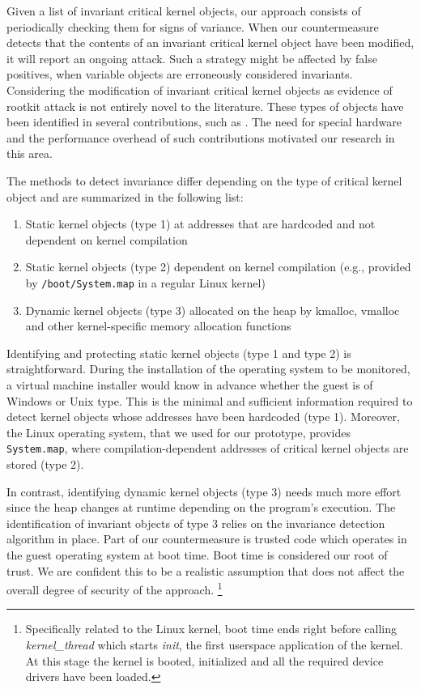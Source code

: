 Given a list of invariant critical kernel objects, our approach consists of periodically checking them for signs of variance. When our countermeasure detects that the contents of an invariant critical kernel object have been modified, it will report an ongoing attack. Such a strategy might be affected by false positives, when variable objects are erroneously considered invariants.   
Considering the modification of invariant critical kernel objects as evidence of rootkit attack is not entirely novel to the literature. These types of objects have been identified in several contributions, such as \cite{HookSafe,6,7,8}. The need for special hardware and the performance overhead of such contributions motivated our research in this area. 

The methods to detect invariance differ depending on the type of critical kernel object and are summarized in the following list:

\begin{enumerate}
\item Static kernel objects (type 1) at addresses that are hardcoded and not dependent on kernel compilation 
\item Static kernel objects (type 2) dependent on kernel compilation (e.g., provided by \texttt{/boot/System.map} in a regular Linux kernel)
\item Dynamic kernel objects (type 3) allocated on the heap by kmalloc, vmalloc and other kernel-specific memory allocation functions
\end{enumerate}

Identifying and protecting static kernel objects (type 1 and type 2) is straightforward. During the installation of the operating system to be monitored, a virtual machine installer would know in advance whether the guest is of Windows or Unix type. This is the minimal and sufficient information required to detect kernel objects whose addresses have been hardcoded (type 1). 
Moreover, the  Linux operating system, that we used for our prototype, provides \texttt{System.map}, where compilation-dependent addresses of critical kernel objects are stored (type 2). 


In contrast, identifying dynamic kernel objects (type 3) needs much more effort since the heap changes at runtime depending on the program's execution. The identification of invariant objects of type 3 relies on the invariance detection algorithm in place. 
Part of our countermeasure is trusted code which operates in the guest operating system at boot time. Boot time is considered our root of trust. We are confident this to be a realistic assumption that does not affect the overall degree of security of the approach. \footnote{Specifically related to the Linux kernel, boot time ends right before calling \emph{kernel\_thread} which starts \emph{init}, the first userspace application of the kernel. At this stage the kernel is booted, initialized and all the required device drivers have been loaded.}

